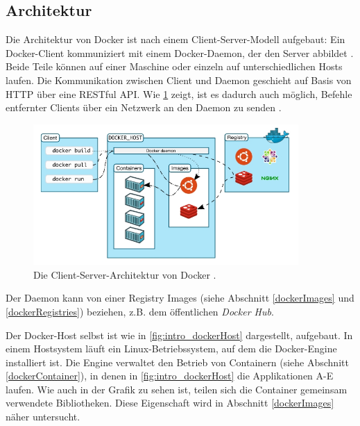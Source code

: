 \documentclass[../main.tex]{subfiles}
\begin{document}
		\subsection{Architektur}
		\label{dockerArchitecture}
      Die Architektur von Docker ist nach einem Client-Server-Modell aufgebaut: Ein Docker-Client kommuniziert mit einem Docker-Daemon, der den Server abbildet \cite{dockerUnderstandingDocker}. Beide Teile können auf einer Maschine oder einzeln auf unterschiedlichen Hosts laufen. Die Kommunikation zwischen Client und Daemon geschieht auf Basis von \acrshort{HTTP} über eine \acrshort{REST}ful \acrshort{API}. Wie \fig \ref{fig:intro_dockerArchitecture} zeigt, ist es dadurch auch möglich, Befehle entfernter Clients über ein Netzwerk an den Daemon zu senden \cite[S.3]{dockerSecIntro}.

      \begin{figure}[h]
          \centering
          \includegraphics[width=0.9\textwidth]{./images/intro_dockerArchitecture.jpg}
          \caption{Die Client-Server-Architektur von Docker \cite{dockerUnderstandingDocker}.}
          \label{fig:intro_dockerArchitecture}
      \end{figure}

      Der Daemon kann von einer Registry Images (siehe Abschnitt \ref{dockerImages} und \ref{dockerRegistries}) beziehen, z.B. dem öffentlichen \emph{Docker Hub}.

      Der Docker-Host selbst ist wie in \fig \ref{fig:intro_dockerHost} dargestellt, aufgebaut. In einem Hostsystem läuft ein Linux-Betriebssystem, auf dem die Docker-Engine installiert ist. Die Engine verwaltet den Betrieb von Containern (siehe Abschnitt \ref{dockerContainer}), in denen in \fig \ref{fig:intro_dockerHost} die Applikationen A-E laufen. Wie auch in der Grafik zu sehen ist, teilen sich die Container gemeinsam verwendete Bibliotheken. Diese Eigenschaft wird in Abschnitt \ref{dockerImages} näher untersucht.
\end{document}
